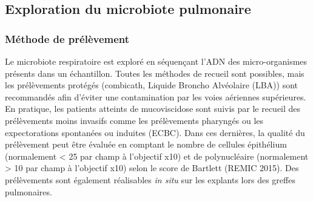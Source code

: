 \documentclass[12pt,a4paper]{article}
\begin{document}
\subsection{Exploration du microbiote pulmonaire}

\subsubsection{Méthode de prélèvement}
Le microbiote respiratoire est exploré en séquençant l'ADN des micro-organismes présents dans un échantillon.
Toutes les méthodes de recueil sont possibles, mais les prélèvements protégés (combicath, Liquide Broncho Alvéolaire (LBA)) sont recommandés afin
d’éviter une contamination par les voies aériennes supérieures. En pratique, les patients atteints de mucoviscidose sont suivis par le recueil des prélèvements moins invasifs comme les prélèvements pharyngés ou les expectorations spontanées ou induites (ECBC). Dans ces dernières, la qualité du prélèvement peut être évaluée en comptant le nombre de cellules épithélium (normalement < 25 par champ à l'objectif x10) et de polynucléaire (normalement > 10 par champ à l'objectif x10) selon le score de Bartlett (REMIC 2015). Des prélèvements sont également réalisables \textit{in situ}  sur les explants lors des greffes pulmonaires.
\end{document}
